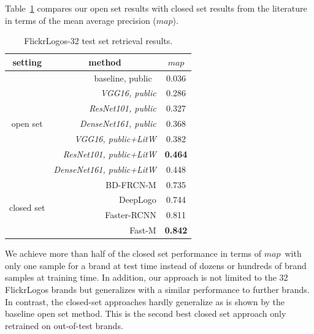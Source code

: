 \documentclass[a4paper,twoside]{article}
\newcommand{\map}{$\mathit{map}$}
\begin{document}
%
Table~\ref{tab:mapFlickr} compares our open set results with closed set results from the literature in terms of the mean average precision (\map). 
%
\begin{table}[t]
\centering
\begingroup	
\setlength{\tabcolsep}{6pt}
\caption{FlickrLogos-32 test set retrieval results.}
\label{tab:mapFlickr}
\begin{small}
\begin{tabular}{crc}
\textbf{setting} & \multicolumn{1}{c}{\textbf{method}} & \textbf{\map} \bigstrut[b]\\
\hline
\multirow{7}[2]{*}{\begin{sideways}open set\end{sideways}} & baseline, public~\cite{su2016} & 0.036 \bigstrut[t]\\
      & \textit{VGG16, public} & 0.286 \\
      & \textit{ResNet101, public} & 0.327 \\
      & \textit{DenseNet161, public} & 0.368 \\
\cline{2-3}      
      & \textit{VGG16, public+\ac{LitW}} & 0.382 \bigstrut[t]\\
      & \textit{ResNet101, public+\ac{LitW}} & \textbf{0.464} \\
      & \textit{DenseNet161, public+\ac{LitW}} & 0.448  \bigstrut[b]\\      
\hline
\multirow{4}[1]{*}{\begin{sideways}closed set\end{sideways}} & BD-FRCN-M \cite{oliveira2016} & 0.735 \bigstrut[t]\\	
      & DeepLogo \cite{iandola2015} & 0.744 \\ 
      & Faster-RCNN \cite{su2016} & 0.811 \\
      & Fast-M \cite{bao2016} & \textbf{0.842} \\
\end{tabular}%
\end{small}
\endgroup
\end{table}
We achieve more than half of the closed set performance in terms of \map~with only one sample for a brand at test time instead of dozens or hundreds of brand samples at training time. In addition, our approach is not limited to the 32 FlickrLogos brands but generalizes with a similar performance to further brands. In contrast, the closed-set approaches hardly generalize as is shown by the baseline open set method. This is the second best closed set approach only retrained on out-of-test brands.
\end{document}
